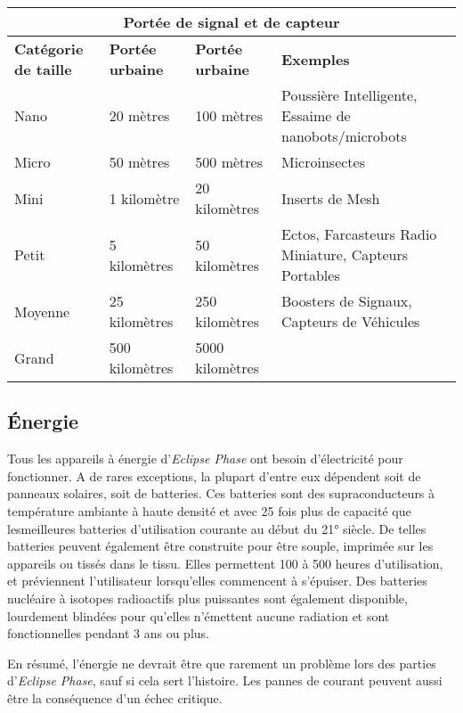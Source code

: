 \begin{table} \begin{tabularx}{\textwidth}{|l|l|l|X|} \hline

\multicolumn{4}{|c|}{\textbf{Portée de signal et de capteur}}	\\ \hline

\textbf{Catégorie de taille}	&\textbf{Portée urbaine}	&\textbf{Portée urbaine}	&\textbf{Exemples} \\ \hline

Nano &20 mètres &100 mètres	&Poussière Intelligente, Essaime de nanobots/microbots \\ Micro	&50 mètres	&500 mètres	&Microinsectes \\ Mini	&1 kilomètre	&20 kilomètres	&Inserts de Mesh\\ Petit	&5 kilomètres	&50 kilomètres	&Ectos, Farcasteurs Radio Miniature, Capteurs Portables \\ Moyenne	&25 kilomètres	&250 kilomètres	&Boosters de Signaux, Capteurs de Véhicules \\ Grand	&500 kilomètres	&5000 kilomètres	&\\ \hline

\end{tabularx} \label{tab:radio-sensor-ranges} \end{table} 



\subsection{Énergie} \label{sec:power} 

Tous les appareils à énergie d'\emph{Eclipse Phase} ont besoin d'électricité pour fonctionner. A de rares exceptions, la plupart d'entre eux dépendent soit de panneaux solaires, soit de batteries. Ces batteries sont des supraconducteurs à température ambiante à haute densité et avec 25 fois plus de capacité que lesmeilleures batteries d'utilisation courante au début du 21° siècle. De telles batteries peuvent également être construite pour être souple, imprimée sur les appareils ou tissés dans le tissu. Elles permettent 100 à 500 heures d'utilisation, et préviennent l'utilisateur lorsqu'elles commencent à s'épuiser. Des batteries nucléaire à isotopes radioactifs plus puissantes sont également disponible, lourdement blindées pour qu'elles n'émettent aucune radiation et sont fonctionnelles pendant 3 ans ou plus. 

En résumé, l'énergie ne devrait être que rarement un problème lors des parties d'\emph{Eclipse Phase}, sauf si cela sert l'histoire. Les pannes de courant peuvent aussi être la conséquence d'un échec critique. 



